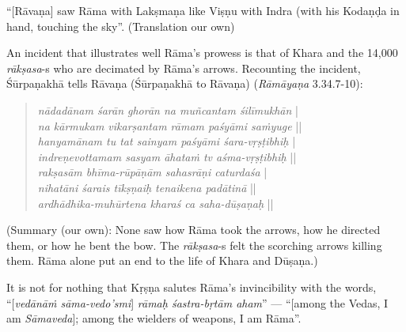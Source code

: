\begin{myquote}
“[Rāvaṇa] saw Rāma with Lakṣmaṇa like Viṣṇu with Indra (with his Kodaṇḍa in hand, touching the sky”. (Translation our own)
\end{myquote}

An incident that illustrates well Rāma’s prowess is that of Khara and the 14,000 {\sl rākṣasa}-s who are decimated by Rāma’s arrows. Recounting the incident, Śūrpaṇakhā tells Rāvaṇa (Śūrpaṇakhā to Rāvaṇa) ({\sl Rāmāyaṇa} 3.34.7-10): 
\begin{quote}
{{\sl nādadānam śarān ghorān na muñcantam śilīmukhān}} |\\
{\sl na kārmukam vikarṣantam rāmam paśyāmi saṁyuge} ||\\
{\sl hanyamānam tu tat sainyam paśyāmi śara-vṛṣṭibhiḥ} |\\
{\sl indreṇevottamam sasyam āhataṁ tv aśma-vṛṣṭibhiḥ} ||\\
{\sl rakṣasām bhīma-rūpāṇām sahasrāṇi caturdaśa} |\\
{\sl nihatāni śarais tīkṣṇaiḥ tenaikena padātinā} ||\\
{\sl ardhādhika-muhūrtena kharaś ca saha-dūṣaṇaḥ} ||
\end{quote}

\begin{myquote}
(Summary (our own): None saw how Rāma took the arrows, how he directed them, or how he bent the bow. The {\sl rākṣasa}-s felt the scorching arrows killing them. Rāma alone put an end to the life of Khara and Dūṣaṇa.)  
\end{myquote}

It is not for nothing that Kṛṣṇa salutes Rāma’s invincibility with the words, “[{\sl vedānāṁ sāma-vedo'smi}] {\sl rāmaḥ śastra-bṛtām aham}” --- “[among the Vedas, I am {\sl Sāmaveda}]; among the wielders of weapons, I am Rāma”. 

